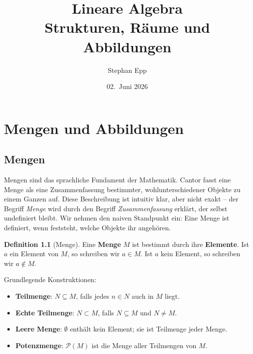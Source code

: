 ﻿\documentclass[a4paper,12pt]{report}
\title{\textbf{Lineare Algebra} \\ {\Large Strukturen, Räume und Abbildungen}}
\author{Stephan Epp}
\date{02.\ Juni 2026}
\theoremstyle{definition}
\newtheorem{definition}{Definition}
\begin{document}
\renewcommand{\proofname}{Beweis}
\maketitle
\tableofcontents
\newpage

\chapter{Mengen und Abbildungen}

\section{Mengen}

Mengen sind das sprachliche Fundament der Mathematik. Cantor fasst eine Menge als
eine Zusammenfassung bestimmter, wohlunterschiedener Objekte zu einem Ganzen auf.
Diese Beschreibung ist intuitiv klar, aber nicht exakt -- der Begriff \emph{Menge}
wird durch den Begriff \emph{Zusammenfassung} erklärt, der selbst undefiniert bleibt.
Wir nehmen den naiven Standpunkt ein: Eine Menge ist definiert, wenn feststeht,
welche Objekte ihr angehören.

\begin{definition}[Menge]
    Eine \textbf{Menge} $M$ ist bestimmt durch ihre \textbf{Elemente}. Ist $a$ ein
    Element von $M$, so schreiben wir $a \in M$. Ist $a$ kein Element, so schreiben
    wir $a \notin M$.

    Grundlegende Konstruktionen:
    \begin{itemize}
        \item[-] \textbf{Teilmenge}: $N \subseteq M$, falls jedes $n \in N$ auch in $M$ liegt.
        \item[-] \textbf{Echte Teilmenge}: $N \subset M$, falls $N \subseteq M$ und
              $N \neq M$.
        \item[-] \textbf{Leere Menge}: $\emptyset$ enthält kein Element; sie ist
              Teilmenge jeder Menge.
        \item[-] \textbf{Potenzmenge}: $\mathcal{P}(M)$ ist die Menge aller
              Teilmengen von $M$.
    \end{itemize}
\end{definition}
\end{document}
